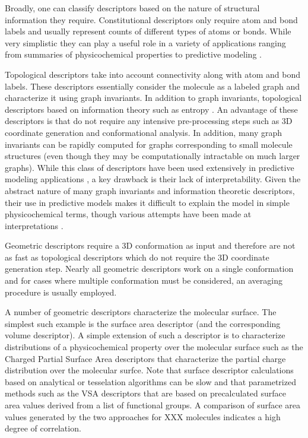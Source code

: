 \documentclass[letterpaper, 12pt]{article}
\begin{document}
Broadly, one can classify descriptors based on the nature of
structural information they require. Constitutional descriptors only
require atom and bond labels and usually represent counts of different
types of atoms or bonds. While very simplistic they can play a useful
role in a variety of applications ranging from summaries of
physicochemical properties to predictive modeling
\cite{Bender:2005aa}.  

Topological descriptors take into account connectivity along with atom
and bond labels. These descriptors essentially consider the molecule
as a labeled graph and characterize it using graph invariants. In
addition to graph invariants, topological descriptors based on
information theory such as entropy \cite{Dehmer:2009uq}. An advantage
of these descriptors is that do not require any intensive
pre-processing steps such as 3D coordinate generation and
conformational analysis. In addition, many graph invariants can be
rapidly computed for graphs corresponding to small molecule structures
(even though they may be computationally intractable on much larger
graphs). While this class of descriptors have been used extensively in
predictive modeling applications
\cite{Garcia-Domenech:2008aa,Randic:2001ac,Randic:2001ad,Besalu:2001aa,jcics:1995:35:272,Kier:1986ae},
a key drawback is their lack of interpretability. Given the abstract
nature of many graph invariants and information theoretic descriptors,
their use in predictive models makes it difficult to explain the model
in simple physicochemical terms, though various attempts have been  
made at interpretations \cite{Todeschini:1975dq,Stanton:2003aa}.

Geometric descriptors require a 3D conformation as input and therefore
are not as fast as topological descriptors which do not require the 3D
coordinate generation step. Nearly all geometric descriptors work on a
single conformation and for cases where multiple conformation must be
considered, an averaging procedure is usually employed.

A number of geometric descriptors characterize the molecular
surface. The simplest such example is the surface area descriptor (and
the corresponding volume descriptor). A simple extension of such a
descriptor is to characterize distributions of a physicochemical
property over the molecular surface such as the Charged Partial
Surface Area descriptors \cite{Stanton:1990aa} that characterize the
partial charge distribution over the molecular surfce. Note that
surface descriptor calculations based on analytical
\cite{Connolly:1983aa} or tesselation algorithms
\cite{Eisenhaber:1995qf} can be slow and that parametrized methods
such as the VSA descriptors \cite{Labute:2008aa} that are based on
precalculated surface area values derived from a list of functional
groups. A comparison of surface area values generated by the two
approaches for XXX molecules indicates a high degree of
correlation. 
\end{document}
